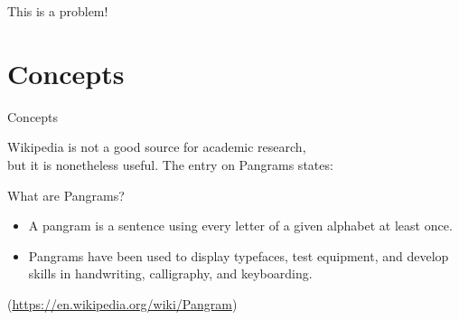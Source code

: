 \documentclass[
  xcolor={hyperref,svgnames,x11names,table},
  hyperref={pdfencoding=unicode,plainpages=false,pdfpagelabels=true,breaklinks=true},
  brazilian,english,12pt,aspectratio=149,
]{beamer}
\begin{document}
\begin{frame}[standout]
  This is a problem!
\end{frame}

\section{Concepts}

\begin{frame}{Concepts}

Wikipedia is not a good source for academic research,\\
but it is nonetheless useful. The entry on Pangrams states:

\vspace{\baselineskip}

  \begin{block}{What are Pangrams?}
    \begin{itemize}
      \item A \alert{pangram} is a sentence using every letter of a given
            alphabet at least once.
      \item Pangrams have been used to display typefaces, test equipment,
            and develop skills in handwriting, calligraphy, and keyboarding.
    \end{itemize}
  \end{block}

\vspace{\baselineskip}

(\url{https://en.wikipedia.org/wiki/Pangram})

\end{frame}
\end{document}
